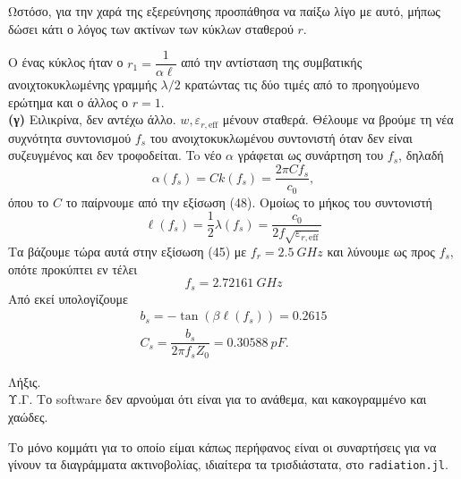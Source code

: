 \documentclass[12pt]{article}
\begin{document}
Ωστόσο, για την χαρά της εξερεύνησης προσπάθησα να παίξω λίγο με αυτό, μήπως δώσει κάτι ο λόγος των ακτίνων των κύκλων σταθερού \(r\). 

Ο ένας κύκλος ήταν ο \(r_1 = \dfrac{1}{\alpha \ell}\) από την αντίσταση της συμβατικής ανοιχτοκυκλωμένης γραμμής \(\lambda/2\) κρατώντας τις δύο τιμές από το προηγούμενο ερώτημα και ο άλλος ο \(r = 1\). \\

\textbf{(γ)} Ειλικρίνα, δεν αντέχω άλλο. \(w, \varepsilon_{r, \text{eff}}\) μένουν σταθερά. Θέλουμε να βρούμε τη νέα συχνότητα συντονισμού \(f_s\) του ανοιχτοκυκλωμένου συντονιστή όταν δεν είναι συζευγμένος και δεν τροφοδείται. To νέο \(\alpha\) γράφεται ως συνάρτηση του \(f_s\), δηλαδή
\begin{equation}
    \alpha(f_s) = Ck(f_s) = \dfrac{2\pi C f_s}{c_0}, 
\end{equation}
όπου το \(C \) το παίρνουμε από την εξίσωση (48). 
Ομοίως το μήκος του συντονιστή
\begin{equation}
    \ell(f_s) = \frac{1}{2}\lambda(f_s) = \dfrac{c_0 }{2f\sqrt{\varepsilon_{r, \text{eff}}}}
\end{equation}
Τα βάζουμε τώρα αυτά στην εξίσωση (45) με \(f_r = \SI{2.5 }{GHz }\) και λύνουμε ως προς \(f_s\), οπότε προκύπτει εν τέλει 
\begin{equation}
    f_s = \SI{2.72161}{GHz}
\end{equation}
Από εκεί υπολογίζουμε 
\begin{gather}
    b_s = -\tan(\beta \ell(f_s)) = 0.2615 \\
    C_s = \dfrac{b_s }{2\pi f_s Z_0} = \SI{0.30588}{pF}.
\end{gather}

Λήξις. \\

Υ.Γ. Το software δεν αρνούμαι ότι είναι για το ανάθεμα, και κακογραμμένο και χαώδες. 

Το μόνο κομμάτι για το οποίο είμαι κάπως περήφανος είναι οι συναρτήσεις για να γίνουν τα διαγράμματα ακτινοβολίας, ιδιαίτερα τα τρισδιάστατα, στο \texttt{radiation.jl}. 
\end{document}
